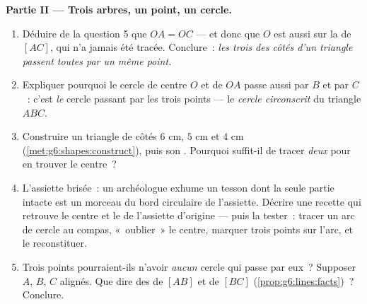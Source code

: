 \begin{problem}
\medskip
\noindent\textbf{Partie II --- Trois arbres, un point, un cercle.}
\begin{enumerate}[resume]
  \item Déduire de la question 5 que $OA = OC$ --- et donc que $O$
        est aussi sur la  de $[AC]$, qui n'a jamais été
        tracée. Conclure~: \emph{les trois  des côtés
        d'un triangle passent toutes par un même point.}
  \item Expliquer pourquoi le cercle de centre $O$ et de  $OA$
        passe aussi par $B$ et par $C$~: c'est \emph{le} cercle
        passant par les trois points --- le \emph{cercle
        circonscrit} du triangle $ABC$.
  \item Construire un triangle de côtés $6$ cm, $5$ cm et $4$ cm
        (\cref{met:g6:shapes:construct}), puis son . Pourquoi suffit-il de tracer \emph{deux}
         pour en trouver le centre~?
  \item L'assiette brisée~: un archéologue exhume un tesson dont la
        seule partie intacte est un morceau du bord circulaire de
        l'assiette. Décrire une recette qui retrouve le centre et le
         de l'assiette d'origine --- puis la tester~: tracer un
        arc de cercle au compas, «~oublier~» le centre, marquer
        trois points sur l'arc, et le reconstituer.
  \item Trois points pourraient-ils n'avoir \emph{aucun} cercle qui
        passe par eux~? Supposer $A$, $B$, $C$ alignés. Que dire des
         de $[AB]$ et de $[BC]$
        (\cref{prop:g6:lines:facts})~? Conclure.
\end{enumerate}


\end{problem}
